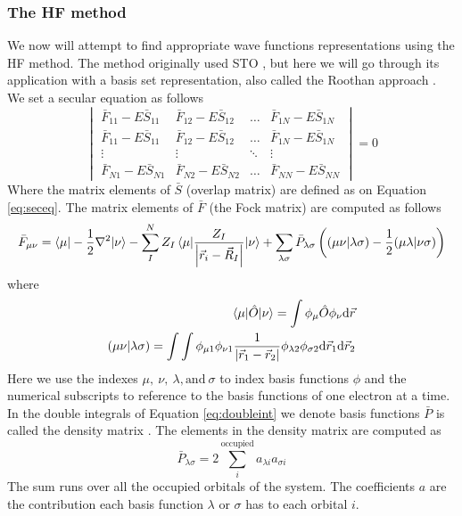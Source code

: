 \documentclass[../master_thesis.tex]{subfiles}
\begin{document}
\subsubsection{The \ac{HF} method}
We now will attempt to find appropriate wave functions representations using the \ac{HF} method.
The method originally used \ac{STO} \cite{Cramer:2004}, but here we will
go through its application with a basis set representation, also called the Roothan approach
\cite{Cramer:2004, Helgaker:2012}.
We set a secular equation as follows
\begin{equation}\label{eq:fockseceq}
  \begin{vmatrix}
    \bar{F}_{11} - E\bar{S}_{11} & \bar{F}_{12} - E\bar{S}_{12} & \ldots & \bar{F}_{1N} - E\bar{S}_{1N} \\
    \bar{F}_{11} - E\bar{S}_{11} & \bar{F}_{12} - E\bar{S}_{12} & \ldots & \bar{F}_{1N} - E\bar{S}_{1N} \\
    \vdots & \vdots & \ddots & \vdots\\
    \bar{F}_{N1} - E\bar{S}_{N1} & \bar{F}_{N2} - E\bar{S}_{N2} & \ldots & \bar{F}_{NN} - E\bar{S}_{NN}
  \end{vmatrix} = 0
\end{equation}
Where the matrix elements of $\bar{S}$ (overlap matrix) are defined as on Equation
\ref{eq:seceq}. The matrix elements of $\bar{F}$ (the Fock matrix) are computed
as follows \cite{Cramer:2004}
\begin{equation}\label{eq:Fockmatrix}
  \bar{F}_{\mu\nu} = \braket{\mu|-\frac{1}{2}\nabla^2|\nu}
  - \sum^N_IZ_I\braket{\mu|\frac{Z_I}{\abs{\vec{r}_i
  - \vec{R}_I}}|\nu} + \sum_{\lambda\sigma} \bar{P}_{\lambda \sigma}\left( (\mu\nu|\lambda\sigma) - \frac{1}{2}(\mu\lambda|\nu\sigma) \right)
\end{equation}
where
\begin{align}\label{eq:doubleint}
  \braket{\mu|\hat{O}| \nu} = \int\phi_{\mu}\hat{O}\phi_{\nu}\text{d}\vec{r}\\
  (\mu\nu|\lambda\sigma) = \int\int\phi_{\mu1}\phi_{\nu1}\frac{1}{\abs{\vec{r}_1 - \vec{r}_2}}\phi_{\lambda2}\phi_{\sigma2} \text{d}\vec{r}_1\text{d}\vec{r}_2
\end{align}
Here we use the indexes $\mu,\ \nu,\ \lambda, \text{and}\ \sigma$ to index basis
functions $\phi$ and the numerical subscripts to reference to the basis functions
of one electron at a time.
In the double integrals of Equation \ref{eq:doubleint} we denote basis functions
$\bar{P}$ is called the density matrix \cite{Cramer:2004}. The elements in the
density matrix are computed as \cite{Cramer:2004}
\begin{equation}
  \bar{P}_{\lambda\sigma} = 2 \sum_i^{\text{occupied}}a_{\lambda i}a_{\sigma i}
\end{equation}
The sum runs over all the occupied orbitals of the system. The coefficients $a$
are the contribution each basis function $\lambda$ or $\sigma$ has to each orbital $i$.
\end{document}
